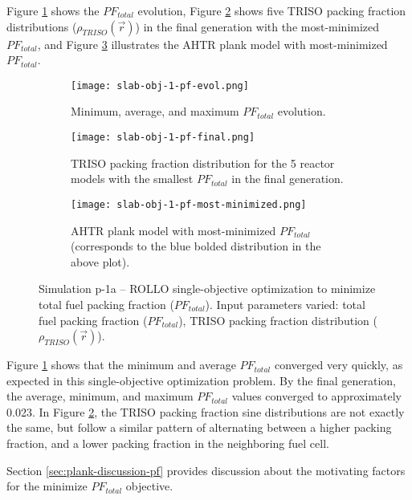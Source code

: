 Figure \ref{fig:slab-obj-1-pf-evol} shows the $PF_{total}$ evolution,  
Figure \ref{fig:slab-obj-1-pf-final} shows five TRISO packing fraction 
distributions ($\rho_{TRISO}(\vec{r})$) in the final generation with the 
most-minimized $PF_{total}$, and Figure \ref{fig:slab-obj-1-pf-most-minimized} 
illustrates the \gls{AHTR} plank model with most-minimized $PF_{total}$.
\begin{figure}[htbp!]
    \centering
    \begin{subfigure}{0.9\textwidth}
        \texttt{[image: slab-obj-1-pf-evol.png]}
        \caption{Minimum, average, and maximum $PF_{total}$ evolution.}
        \label{fig:slab-obj-1-pf-evol} 
    \end{subfigure}
    \begin{subfigure}{0.9\textwidth}
        \texttt{[image: slab-obj-1-pf-final.png]}
        \caption{TRISO packing fraction distribution for the 5 reactor models with the 
        smallest $PF_{total}$ in the final generation.}
        \label{fig:slab-obj-1-pf-final} 
    \end{subfigure}
    \begin{subfigure}{0.9\textwidth}
        \texttt{[image: slab-obj-1-pf-most-minimized.png]}
        \caption{\gls{AHTR} plank model with most-minimized $PF_{total}$ 
        (corresponds to the blue bolded distribution in the above plot).}
        \label{fig:slab-obj-1-pf-most-minimized} 
    \end{subfigure}
    \caption{Simulation p-1a -- ROLLO single-objective optimization to minimize total 
    fuel packing fraction ($PF_{total}$). 
    Input parameters varied: total fuel packing fraction 
    ($PF_{total}$), \gls{TRISO} packing fraction distribution ($\rho_{TRISO}(\vec{r})$).}
    \label{fig:slab-obj-1-pf}
\end{figure}

Figure \ref{fig:slab-obj-1-pf-evol} shows that the minimum and average $PF_{total}$ 
converged very quickly, as expected in this single-objective optimization 
problem.
By the final generation, the average, minimum, and maximum $PF_{total}$
values converged to approximately 0.023. 
In Figure \ref{fig:slab-obj-1-pf-final}, the \gls{TRISO} packing fraction
sine distributions are not exactly the same, but follow a similar pattern of 
alternating between a higher packing fraction, and a lower packing fraction 
in the neighboring fuel cell. 

Section \ref{sec:plank-discussion-pf} provides discussion about the motivating factors 
for the minimize $PF_{total}$ objective. 

